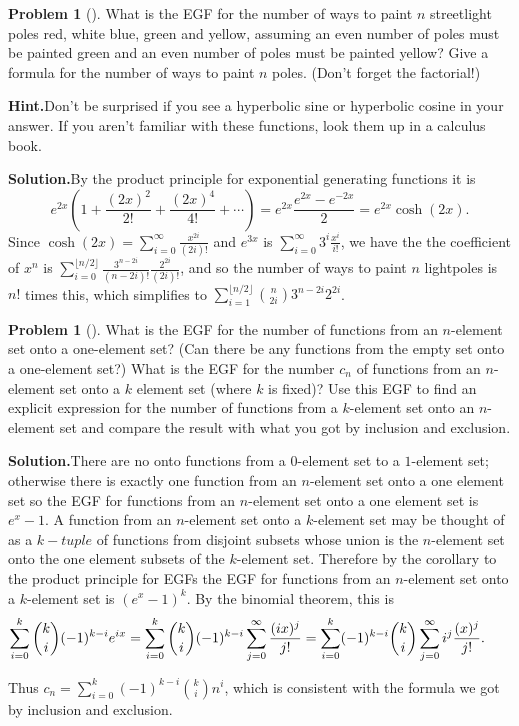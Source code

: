 \documentclass[10pt,]{book}
\theoremstyle{plain}
\theoremstyle{definition}
\newtheorem{activity}[project]{Problem}
\theoremstyle{definition}
\numberwithin{equation}{chapter}
\begin{document}
\begin{activity}[]\label{activity-404}
What is the EGF for the number of ways to paint \(n\) streetlight poles red, white blue, green and yellow, assuming an even number of poles must be painted green and an even number of poles must be  painted yellow? Give a formula for the number of ways to paint \(n\) poles.  (Don't forget the factorial!)%
\par\medskip\noindent%
\textbf{Hint.}\quad Don't be surprised if you see a hyperbolic sine or hyperbolic cosine in your answer. If you aren't familiar with these functions, look them up in a calculus book.%
\par\medskip\noindent%
\textbf{Solution.}\quad By the product principle for exponential generating functions it is%
\begin{equation*}
e^{2x}\left(1+\frac{(2x)^2}{2!}+ \frac{(2x)^4}{4!} + \cdots \right) =
e^{2x}\frac{e^{2x}-e^{-2x}}{2}=e^{2x}\cosh(2x).
\end{equation*}
Since \(\cosh(2x) = \sum_{i=0}^\infty \frac{x^{2i}}{(2i)!}\) and \(e^{3x}\) is \(\sum_{i=0}^\infty 3^i \frac{x^i}{i!}\), we have the the coefficient of \(x^n\) is \(\sum_{i=0}^{\lfloor n/2 \rfloor} \frac{3^{n-2i}}{(n-2i)!}\frac{2^{2i}}{(2i)!}\), and so the number of ways to paint \(n\) lightpoles is \(n!\) times this, which simplifies to \(\sum_{i=1}^{\lfloor n/2 \rfloor} \binom{n}{2i} 3^{n-2i}2^{2i}\).%
\end{activity}
\begin{activity}[]\label{activity-405}
What is the EGF for the number of functions from an \(n\)-element set onto a one-element set? (Can there be any functions from the empty set onto a one-element set?) What is the EGF for the number \(c_n\) of functions from an \(n\)-element set onto a \(k\) element set (where \(k\) is fixed)? Use this EGF to find an explicit expression for the number of functions from a \(k\)-element set onto an \(n\)-element set and compare the result with what you got by inclusion and exclusion.%
\par\medskip\noindent%
\textbf{Solution.}\quad There are no onto functions from a \(0\)-element set to a \(1\)-element set; otherwise there is exactly one function from an \(n\)-element set onto a one element set so the EGF for functions from an \(n\)-element set onto a one element set is \(e^x-1\). A function from an \(n\)-element set onto a \(k\)-element set may be thought of as a \(k-tuple\) of functions from disjoint subsets whose union is the \(n\)-element set onto the one element subsets of the \(k\)-element set. Therefore by the corollary to the product principle for EGFs the EGF for functions from an \(n\)-element set onto a \(k\)-element set is \((e^x-1)^k\). By the binomial theorem, this is%
\begin{equation*}
\kern-.25 in\sum_{i=0}^k\binom{k}{i}(-1)^{k-i}e^{ix}
=
\sum_{i=0}^k \binom{k}{i} (-1)^{k-i} \sum_{j=0}^\infty \frac{(ix)^j}{j!} =
\sum_{i=0}^k (-1)^{k-i}\binom{k}{i} \sum_{j=0}^\infty i^j\frac{(x)^j}{j!}.
\end{equation*}
%
\par
Thus \(c_n= \sum_{i=0}^k(-1)^{k-i}\binom{k}{i}n^i\), which is consistent with the formula we got by inclusion and exclusion.%
\end{activity}
\end{document}
